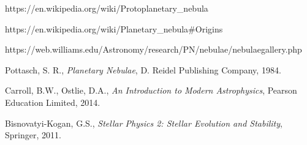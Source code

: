 \documentclass[a4paper,10pt, twocolumn]{article}
\begin{document}
https://en.wikipedia.org/wiki/Protoplanetary_nebula

https://en.wikipedia.org/wiki/Planetary_nebula#Origins

https://web.williams.edu/Astronomy/research/PN/nebulae/nebulaegallery.php


\begin{thebibliography}{9}
    Pottasch, S. R.,
    \textit{Planetary Nebulae},
    D. Reidel Publishing Company, 
    1984.


    Carroll, B.W., Ostlie, D.A.,
    \textit{An Introduction to Modern Astrophysics},
    Pearson Education Limited, 
    2014.

    Bisnovatyi-Kogan, G.S.,
    \textit{Stellar Physics 2: Stellar Evolution and Stability},
    Springer,
    2011.

\end{thebibliography}
\end{document}
